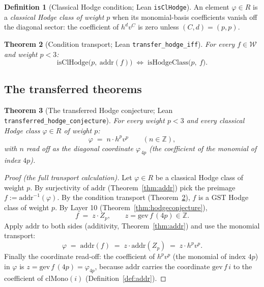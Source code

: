 \documentclass[11pt,a4paper]{article}
\theoremstyle{plain}
\newtheorem{theorem}{Theorem}[section]
\theoremstyle{definition}
\newtheorem{definition}[theorem]{Definition}
\newcommand{\Z}{\mathbb{Z}}
\newcommand{\cycleClass}[1]{Z_{#1}}
\begin{document}
\begin{definition}[Classical Hodge condition; Lean \texttt{isClHodge}]
An element $\varphi \in R$ is a \emph{classical Hodge class of weight $p$}
when its monomial-basis coefficients vanish off the diagonal sector: the
coefficient of $h^{d}v^{C}$ is zero unless $(C,d) = (p,p)$.
\end{definition}

\begin{theorem}[Condition transport; Lean \texttt{transfer\_hodge\_iff}]
\label{thm:condtransport}
For every $f \in \mathcal{W}$ and weight $p<3$:
\[
  \mathrm{isClHodge}\bigl(p,\ \mathrm{addr}(f)\bigr)
  \;\iff\; \mathrm{isHodgeClass}\bigl(p,\ f\bigr).
\]
\end{theorem}

\subsection{The transferred theorems}

\begin{theorem}[The transferred Hodge conjecture; Lean
\texttt{transferred\_hodge\_conjecture}]\label{thm:transferred}
For every weight $p<3$ and every \emph{classical} Hodge class
$\varphi \in R$ of weight $p$:
\[
  \varphi \;=\; n \cdot h^{p}v^{p} \qquad (n \in \Z),
\]
with $n$ read off as the diagonal coordinate
$\varphi_{\,4p}$ (the coefficient of the monomial of index $4p$).
\end{theorem}

\begin{proof}[Proof (the full transport calculation)]
Let $\varphi \in R$ be a classical Hodge class of weight $p$. By
surjectivity of $\mathrm{addr}$ (Theorem~\ref{thm:addr}) pick the preimage
$f := \mathrm{addr}^{-1}(\varphi)$. By the condition transport
(Theorem~\ref{thm:condtransport}), $f$ is a GST Hodge class of weight $p$.
By Layer 10 (Theorem~\ref{thm:hodgeconjecture}),
\[
  f \;=\; z \cdot \cycleClass{p}, \qquad z = \mathrm{gev}\,f\,(4p) \in \Z.
\]
Apply $\mathrm{addr}$ to both sides (additivity, Theorem~\ref{thm:addr})
and use the monomial transport:
\[
  \varphi \;=\; \mathrm{addr}(f) \;=\; z\cdot\mathrm{addr}(\cycleClass{p})
  \;=\; z \cdot h^{p}v^{p}.
\]
Finally the coordinate read-off: the coefficient of $h^{p}v^{p}$ (the
monomial of index $4p$) in $\varphi$ is $z = \mathrm{gev}\,f\,(4p) =
\varphi_{4p}$, because $\mathrm{addr}$ carries the coordinate
$\mathrm{gev}\,f\,i$ to the coefficient of $\mathrm{clMono}(i)$
(Definition~\ref{def:addr}).
\end{proof}
\end{document}
